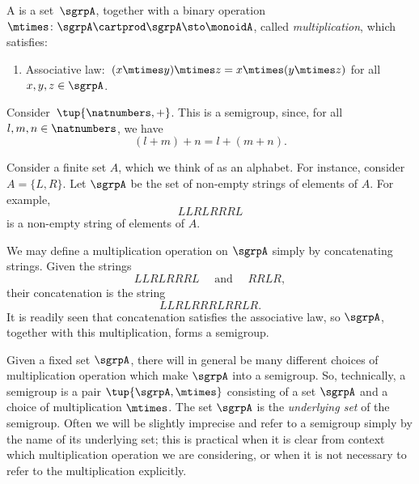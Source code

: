 
\section{}\label{sec:semigroups}


\begin{definition}[Semigroup]
  \label{def:semigroup}
  A \emph{} is a set~$\sgrpA$, together with a binary operation~$\mtimes \colon \sgrpA \cartprod \sgrpA \sto \monoidA$, called \emph{multiplication}, which satisfies:
  \begin{enumerate}
    \item Associative law:~$(x\mtimes y)\mtimes z=x\mtimes (y\mtimes z)$ for all $x , y, z \in \sgrpA$.
  \end{enumerate}
\end{definition}

\begin{example}\label{natnum-semigroup}
  Consider~$\tup{\natnumbers,+}$. This is a semigroup, since, for all~$l,m, n \in \natnumbers$, we have
  \begin{equation*}
  (l+m)
    +n=l+(m+n).
  \end{equation*}
\end{example}

\begin{example}\label{string-semigroup}
Consider a finite set $A$, which we think of as an alphabet. For instance, consider $A = \{ L, R \}$.
Let $\sgrpA$ be the set of non-empty strings of elements of $A$. For example,
$$ LLRLRRRL $$
is a non-empty string of elements of $A$.

We may define a multiplication operation on $\sgrpA$ simply by concatenating strings. Given the strings
$$ LLRLRRRL  \quad \text{ and } \quad RRLR, $$
their concatenation is the string
$$ LLRLRRRLRRLR.$$
It is readily seen that concatenation satisfies the associative law, so $\sgrpA$, together with this multiplication, forms a semigroup.
\end{example}



\begin{remark}
Given a fixed set $\sgrpA$, there will in general be many different choices of multiplication operation which make $\sgrpA$ into a semigroup. So, technically, a semigroup is a pair $\tup{\sgrpA, \mtimes}$ consisting of a set $\sgrpA$ and a choice of multiplication $\mtimes$. The set $\sgrpA$ is the \emph{underlying set} of the semigroup. Often we will be slightly imprecise and refer to a semigroup simply by the name of its underlying set; this is practical when it is clear from context which multiplication operation we are considering, or when it is not necessary to refer to the multiplication explicitly.
\end{remark}

